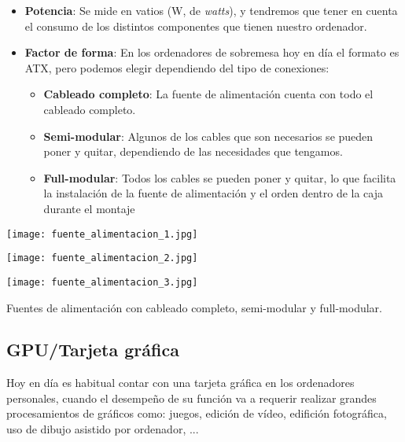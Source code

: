 \begin{itemize}
    \item \textbf{Potencia}: Se mide en vatios (W, de \textit{watts}), y tendremos que tener en cuenta el consumo de los distintos componentes que tienen nuestro ordenador.
    \item \textbf{Factor de forma}: En los ordenadores de sobremesa hoy en día el formato es ATX, pero podemos elegir dependiendo del tipo de conexiones:
    \begin{itemize}
        \item \textbf{Cableado completo}: La fuente de alimentación cuenta con todo el cableado completo.
        \item \textbf{Semi-modular}: Algunos de los cables que son necesarios se pueden poner y quitar, dependiendo de las necesidades que tengamos.

        \item \textbf{Full-modular}: Todos los cables se pueden poner y quitar, lo que facilita la instalación de la fuente de alimentación y el orden dentro de la caja durante el montaje
    \end{itemize}
\end{itemize}
\vspace{15pt}
{
    \hfill
    \begin{minipage}{0.3\linewidth}
        \texttt{[image: fuente\_alimentacion\_1.jpg]}
    \end{minipage}
    \hfill
    \begin{minipage}{0.28\linewidth}
        \texttt{[image: fuente\_alimentacion\_2.jpg]}
    \end{minipage}
    \hfill
    \begin{minipage}{0.24\linewidth}
        \texttt{[image: fuente\_alimentacion\_3.jpg]}
    \end{minipage}
    \vspace{-10pt}
\begin{center}
     \footnotesize{Fuentes de alimentación con cableado completo, semi-modular y full-modular.}
\end{center}
}

\subsection{GPU/Tarjeta gráfica}
Hoy en día es habitual contar con una tarjeta gráfica en los ordenadores personales, cuando el desempeño de su función va a requerir realizar grandes procesamientos de gráficos como: juegos, edición de vídeo, edifición fotográfica, uso de dibujo asistido por ordenador, ...


